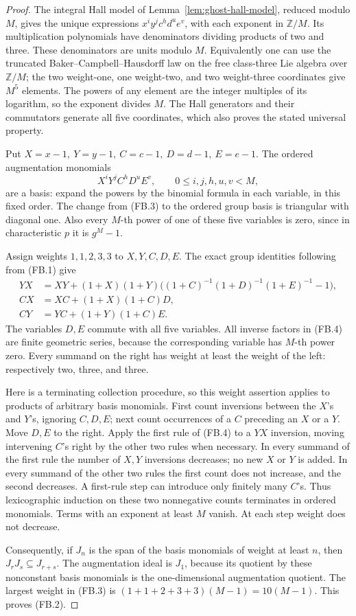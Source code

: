 \begin{proof}
The integral Hall model of Lemma~\ref{lem:ghost-hall-model},
reduced modulo \(M\), gives the unique expressions
\(x^i y^j c^h d^u e^v\), with each exponent in
\(\mathbb Z/M\). Its multiplication polynomials have
denominators dividing products of two and three.
These denominators are units modulo \(M\).
Equivalently one can use the truncated Baker--Campbell--Hausdorff
law on the free class-three Lie algebra over \(\mathbb Z/M\);
the two weight-one, one weight-two, and two weight-three
coordinates give \(M^5\) elements.
The powers of any element are the integer multiples of its
logarithm, so the exponent divides \(M\).
The Hall generators and their commutators generate all five
coordinates, which also proves the stated universal property.

Put \(X=x-1,\ Y=y-1,\ C=c-1,\ D=d-1,\ E=e-1\).
The ordered augmentation monomials
\[
 X^iY^jC^hD^uE^v,\qquad 0\le i,j,h,u,v<M,
 \tag{FB.3}
\]
are a basis: expand the powers by the binomial formula in
each variable, in this fixed order. The change from (FB.3)
to the ordered group basis is triangular with diagonal one.
Also every \(M\)-th power of one of these five variables
is zero, since in characteristic \(p\) it is \(g^M-1\).

Assign weights \(1,1,2,3,3\) to \(X,Y,C,D,E\).
The exact group identities following from (FB.1) give
\[
\begin{split}
 YX&=XY+(1+X)(1+Y)
       \bigl((1+C)^{-1}(1+D)^{-1}(1+E)^{-1}-1\bigr),\\
 CX&=XC+(1+X)(1+C)D,\\
 CY&=YC+(1+Y)(1+C)E.
\end{split}
\tag{FB.4}
\]
The variables \(D,E\) commute with all five variables.
All inverse factors in (FB.4) are finite geometric
series, because the corresponding variable has \(M\)-th
power zero. Every summand on the right has weight at
least the weight of the left: respectively two, three,
and three.

Here is a terminating collection procedure, so this
weight assertion applies to products of arbitrary basis
monomials. First count inversions between the \(X\)'s
and \(Y\)'s, ignoring \(C,D,E\); next count occurrences
of a \(C\) preceding an \(X\) or a \(Y\). Move \(D,E\)
to the right. Apply the first rule of (FB.4) to a
\(YX\) inversion, moving intervening \(C\)'s right by
the other two rules when necessary. In every summand
of the first rule the number of \(X,Y\) inversions
decreases; no new \(X\) or \(Y\) is added. In every
summand of the other two rules the first count does
not increase, and the second decreases. A first-rule
step can introduce only finitely many \(C\)'s.
Thus lexicographic induction on these two nonnegative
counts terminates in ordered monomials. Terms with
an exponent at least \(M\) vanish. At each step weight
does not decrease.

Consequently, if \(J_n\) is the span of the basis
monomials of weight at least \(n\), then
\(J_rJ_s\subseteq J_{r+s}\). The augmentation ideal
is \(J_1\), because its quotient by these nonconstant
basis monomials is the one-dimensional augmentation
quotient. The largest weight in (FB.3) is
\((1+1+2+3+3)(M-1)=10(M-1)\).
This proves (FB.2).
\end{proof}

